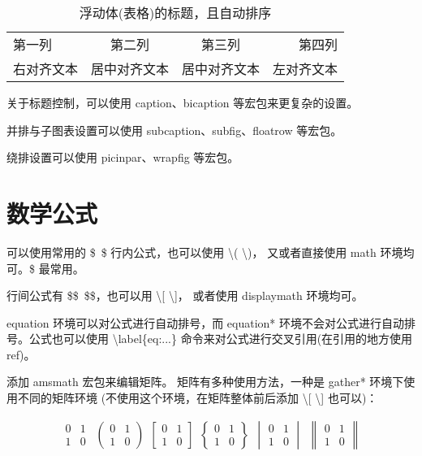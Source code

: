 \documentclass[UTF8]{ctexart}   %
\begin{document}
    \begin{table}[h]
        \centering
        \begin{tabular}{|l|c|c|r|}     
            \hline 第一列 & 第二列 & 第三列 & 第四列 \\
            右对齐文本 & 居中对齐文本 & 居中对齐文本 & 左对齐文本 \\ \hline
        \end{tabular}
        \caption{浮动体(表格)的标题，且自动排序}\label{tab-1}
    \end{table}
    
    关于标题控制，可以使用 caption、bicaption 等宏包来更复杂的设置。

    并排与子图表设置可以使用 subcaption、subfig、floatrow 等宏包。

    绕排设置可以使用 picinpar、wrapfig 等宏包。

    \section{数学公式}

    可以使用常用的 \$~\$ 行内公式，也可以使用 \textbackslash ( \textbackslash )，
    又或者直接使用 math 环境均可。\$ 最常用。

    行间公式有 \$\$~\$\$，也可以用 \textbackslash [ \textbackslash ]，
    或者使用 displaymath 环境均可。
    
    equation 环境可以对公式进行自动排号，而 equation* 环境不会对公式进行自动排号。公式也可以使用 \textbackslash label\{eq:...\} 命令来对公式进行交叉引用(在引用的地方使用ref)。

    添加 amsmath 宏包来编辑矩阵。
    矩阵有多种使用方法，一种是 gather* 环境下使用不同的矩阵环境
    (不使用这个环境，在矩阵整体前后添加 
    \textbackslash [ \textbackslash ] 也可以)：

    \begin{gather*}
    \begin{matrix}
        0 & 1 \\ 1 & 0
    \end{matrix}~~
    \begin{pmatrix}
        0 & 1 \\ 1 & 0
    \end{pmatrix}~~
    \begin{bmatrix}
        0 & 1 \\ 1 & 0
    \end{bmatrix}~~
    \begin{Bmatrix}
        0 & 1 \\ 1 & 0
    \end{Bmatrix}~~
    \begin{vmatrix}
        0 & 1 \\ 1 & 0
    \end{vmatrix}~~
    \begin{Vmatrix}
        0 & 1 \\ 1 & 0
    \end{Vmatrix}
    \end{gather*}
\end{document}

